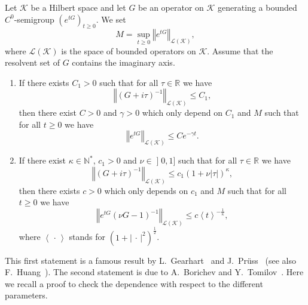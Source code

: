 \documentclass[AHL,Unicode,longabstracts]{cedram}
\newcommand{\abs}[1]{\left\vert #1\right\vert}
\newcommand{\nr}[1]{\left\Vert #1\right\Vert}
\newcommand{\pppg}[1] {\left< #1 \right>}
\renewcommand{\leq}{\leqslant}
\renewcommand{\geq}{\geqslant}
\newcommand{\inv}{^{-1}}
\newcommand{\1}{\mathds 1}
\newcommand{\R}{\mathbb{R}}
\newcommand{\N}{\mathbb{N}}
\renewcommand{\t}{\tau}
\newcommand{\Kc}{{\mathcal K}}
\newcommand{\Lc}{{\mathcal L}}
\begin{document}
\begin{theo}\label{th-GPH-BT}
Let $\Kc$ be a Hilbert space and let $G$ be an operator on $\Kc$ generating a bounded $C^0$-semigroup $(e^{tG})_{t \geq 0}$. We set
\[
M = \sup_{t \geq 0} \nr{e^{tG}}_{\Lc(\Kc)},
\]
where $\Lc(\Kc)$ is the space of bounded operators on $\Kc$. Assume that the resolvent set of $G$ contains the imaginary axis.
\begin{enumerate}%
\item If there exists $C_1 > 0$ such that for all $\t \in \R$ we have
\[
\nr{(G+i\t)\inv}_{\Lc(\Kc)} \leq C_1,
\]
then there exist $C > 0$ and $\gamma > 0$ which only depend on $C_1$ and $M$ such that for all $t \geq 0$ we have
\[
\nr{e^{tG}}_{\Lc(\Kc)} \leq C e^{-\gamma t}.
\]
\item If there exist $\kappa \in \N^*$, $c_1 > 0$ and $\nu \in\mathopen{]}0,1]$ such that for all $\t \in \R$ we have
\[
\nr{(G+i\t)\inv}_{\Lc(\Kc)} \leq c_1 (1+ \nu \abs \t)^{\kappa},
\]
then there exists $c > 0$ which only depends on $c_1$ and $M$ such that for all $t \geq 0$ we have
\[
\nr{e^{tG}(\nu G - 1)\inv}_{\Lc(\Kc)} \leq c \pppg t^{-\frac 1 \kappa},
\]
where $\pppg{\,\cdot\,}$ stands for $(1+\abs{\,\cdot\,}^2)^{\frac 12}$.
\end{enumerate}
\end{theo}

This first statement is a famous result by L.~Gearhart~\cite{Gearhart78} and J.~Pr\"uss~\cite{Pruss84} (see also F.~Huang~\cite{Huang85}). The second statement is due to A.~Borichev and Y.~Tomilov~\cite{BorichevTo10}. Here we recall a proof to check the dependence with respect to the different parameters.
\end{document}
